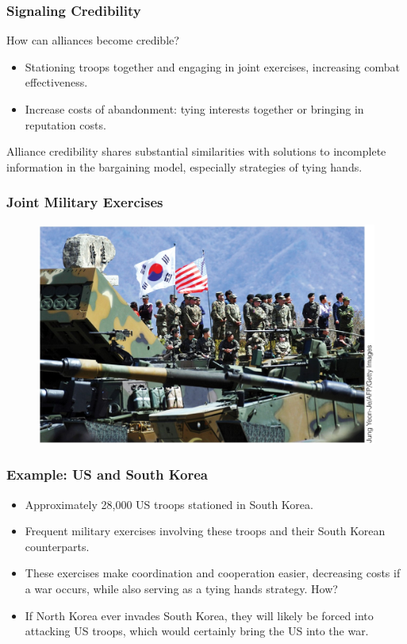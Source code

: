\documentclass{beamer}
\begin{document}
\begin{frame} 
	\frametitle{\LARGE{Signaling Credibility}}
How can alliances become credible?
	\begin{itemize}
		\item Stationing troops together and engaging in joint exercises, increasing combat effectiveness. \pause  
		\item Increase costs of abandonment: tying interests together or bringing in reputation costs. \pause 
	\end{itemize}
Alliance credibility shares substantial similarities with solutions to incomplete information in the bargaining model, especially strategies of tying hands.	
\end{frame}

\begin{frame} 
	\frametitle{\LARGE{Joint Military Exercises}}
	\begin{figure}[ht!]
		\centering
		\includegraphics[width=\textwidth,height=\textheight,keepaspectratio]{USandSKjoint.jpg}
	\end{figure}
\end{frame}

\begin{frame} 
	\frametitle{\LARGE{Example: US and South Korea}}
	\begin{itemize}
		\item Approximately 28,000 US troops stationed in South Korea. \pause  
		\item Frequent military exercises involving these troops and their South Korean counterparts. \pause 
		\item These exercises make coordination and cooperation easier, decreasing costs if a war occurs, while also serving as a tying hands strategy. How? \pause
		\item If North Korea ever invades South Korea, they will likely be forced into attacking US troops, which would certainly bring the US into the war.
	\end{itemize}
\end{frame}
\end{document}
